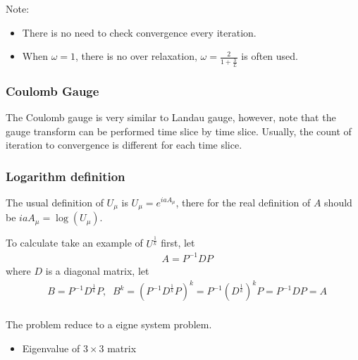 Note:
\begin{itemize}
  \item There is no need to check convergence every iteration.
  \item When $\omega = 1$, there is no over relaxation, $\omega = \frac{2}{1+\frac{3}{L}}$ is often used.
\end{itemize}

\subsubsection{\label{sec:CoulombGauge}Coulomb Gauge}

The Coulomb gauge is very similar to Landau gauge, however, note that the gauge transform can be performed time slice by time slice. Usually, the count of iteration to convergence is different for each time slice.

\subsubsection{\label{sec:LogarithmDefinition}Logarithm definition}

The usual definition of $U_{\mu}$ is $U_{\mu}=e^{iaA_{\mu}}$, there for the real definition of $A$ should be $iaA_{\mu}=\log (U_{\mu})$.

To calculate take an example of $U^{\frac{1}{k}}$ first, let
\begin{equation}
\begin{split}
&A=P^{-1}DP
\end{split}
\end{equation}
where $D$ is a diagonal matrix, let
\begin{equation}
\begin{split}
&B=P^{-1}D^{\frac{1}{k}}P,\;\;B^k=\left(P^{-1}D^{\frac{1}{k}}P\right)^k=P^{-1}\left(D^{\frac{1}{k}}\right)^k P=P^{-1}DP=A\\
\end{split}
\end{equation}

The problem reduce to a eigne system problem.

\begin{itemize}
  \item Eigenvalue of $3\times 3$ matrix
\end{itemize}

